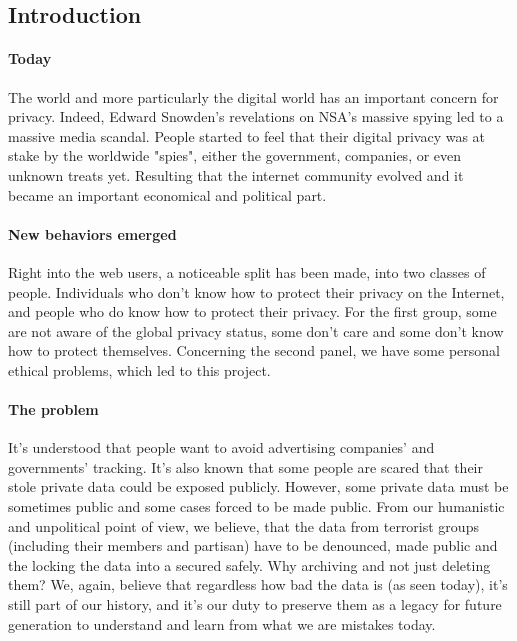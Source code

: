 
\subsection{Introduction}
\paragraph{Today} The world and more particularly the digital world has an important concern for privacy. Indeed, Edward Snowden's revelations on NSA's massive spying\cite{EdwardSnowdenArchive} led to a massive media scandal. People started to feel that their digital privacy was at stake by the worldwide "spies", either the government, companies, or even unknown treats yet. Resulting that the internet community evolved and it became an important economical and political part.

\paragraph{New behaviors emerged} Right into the web users, a noticeable split has been made, into two classes of people. Individuals who don't know how to protect their privacy on the Internet, and people who do know how to protect their privacy. For the first group, some are not aware of the global privacy status, some don't care and some don't know how to protect themselves. Concerning the second panel, we have some personal ethical problems, which led to this project.

\paragraph{The problem} It's understood that people want to avoid advertising companies' and governments' tracking. It's also known that some people are scared that their stole private data could be exposed publicly. However, some private data must be sometimes public and some cases forced to be made public. From our humanistic and unpolitical point of view, we believe, that the data from terrorist groups (including their members and partisan) have to be denounced, made public and the locking the data into a secured safely. Why archiving and not just deleting them? We, again, believe that regardless how bad the data is (as seen today), it's still part of our history, and it's our duty to preserve them as a legacy for future generation to understand and learn from what we are mistakes today.

